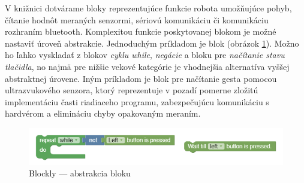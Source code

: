 
V knižnici dotvárame bloky reprezentujúce funkcie robota umožňujúce pohyb, čítanie hodnôt meraných senzormi, sériovú komunikáciu či komunikáciu rozhraním bluetooth. Komplexitou funkcie poskytovanej blokom je možné nastaviť úroveň abstrakcie. Jednoduchým príkladom je blok  (obrázok \ref{obr:wait-till-couch}). Možno ho ľahko vyskladať z blokov \textit{cyklu while}, \textit{negácie} a bloku pre \textit{načítanie stavu tlačidla}, no najmä pre nižšie vekové kategórie je vhodnejšia alternatíva vyššej abstraktnej úrovene. Iným príkladom je blok pre načítanie gesta pomocou ultrazvukového senzora, ktorý reprezentuje v pozadí pomerne zložitú implementáciu časti riadiaceho programu, zabezpečujúcu komunikáciu s hardvérom a elimináciu chyby opakovaným meraním.

\begin{figure}
\centerline{\includegraphics[width=1\textwidth]{images/wait-till-couch}}
\caption[Blockly --- abstrakcia bloku ]{Blockly --- abstrakcia bloku }
\label{obr:wait-till-couch}
\end{figure}

